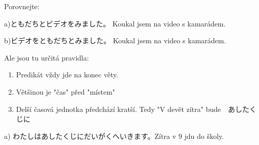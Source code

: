 Porovnejte: 

a)ともだちとビデオをみました。 	Koukal jsem na video s kamarádem.

b)ビデオをともだちとみました。	Koukal jsem na video s kamarádem.


Ale jsou tu určitá pravidla: 
\begin{enumerate}
\item Predikát vždy jde na konec věty.
\item Většinou je "čas" před "místem"
\item Delší časová jednotka předchází kratší. Tedy "V devět zítra" bude　あしたくじに
\end{enumerate}


a) わたしはあしたくじにだいがくへいきます。Zítra v 9 jdu do školy.































